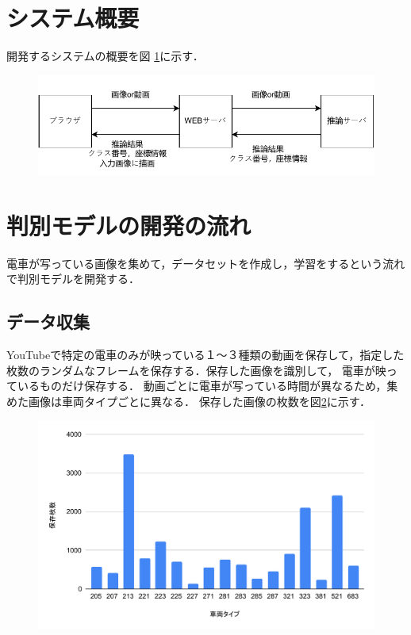 \begin{multicols*}{2}
\section{システム概要}
開発するシステムの概要を図 \ref{abc}に示す．
\begin{figure} %
	\label{abc}
	\centering
	\includegraphics[width=\linewidth]{obj/system.pdf}
\end{figure}

\section{判別モデルの開発の流れ}
電車が写っている画像を集めて，データセットを作成し，学習をするという流れで判別モデルを開発する．

\subsection{データ収集}
	YouTubeで特定の電車のみが映っている１〜３種類の動画を保存して，指定した枚数のランダムなフレームを保存する．保存した画像を識別して，	電車が映っているものだけ保存する．
	動画ごとに電車が写っている時間が異なるため，集めた画像は車両タイプごとに異なる．
	保存した画像の枚数を図\ref{fig:chart}に示す．
	
	\begin{figure}
		\centering
		\includegraphics[width=\linewidth]{obj/chart.pdf}
		\label{fig:chart}
	\end{figure}

\end{multicols*}
